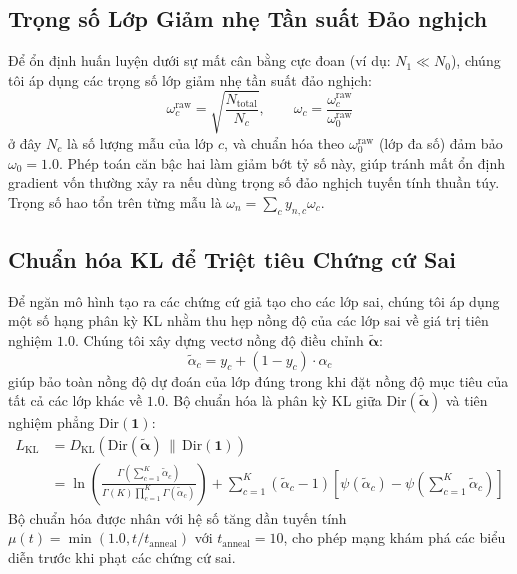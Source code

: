 \documentclass[11pt]{article}
\newcommand{\Dir}{\text{Dir}}
\newcommand{\KL}{D_{\text{KL}}}
\begin{document}
\subsection{Trọng số Lớp Giảm nhẹ Tần suất Đảo nghịch}\label{subsec:class_weight}

Để ổn định huấn luyện dưới sự mất cân bằng cực đoan (ví dụ: $N_1 \ll N_0$), chúng tôi áp dụng các trọng số lớp giảm nhẹ tần suất đảo nghịch:
\begin{equation}\label{eq:class_weights}
    \omega_c^{\text{raw}} = \sqrt{\frac{N_{\text{total}}}{N_c}}, \qquad \omega_c = \frac{\omega_c^{\text{raw}}}{\omega_0^{\text{raw}}}
\end{equation}
ở đây $N_c$ là số lượng mẫu của lớp $c$, và chuẩn hóa theo $\omega_0^{\text{raw}}$ (lớp đa số) đảm bảo $\omega_0 = 1.0$. Phép toán căn bậc hai làm giảm bớt tỷ số này, giúp tránh mất ổn định gradient vốn thường xảy ra nếu dùng trọng số đảo nghịch tuyến tính thuần túy. Trọng số hao tổn trên từng mẫu là $\omega_n = \sum_c y_{n,c} \omega_c$.

\subsection{Chuẩn hóa KL để Triệt tiêu Chứng cứ Sai}\label{subsec:kl_reg}

Để ngăn mô hình tạo ra các chứng cứ giả tạo cho các lớp sai, chúng tôi áp dụng một số hạng phân kỳ KL nhằm thu hẹp nồng độ của các lớp sai về giá trị tiên nghiệm $1.0$. Chúng tôi xây dựng vectơ nồng độ điều chỉnh $\tilde{\bm{\alpha}}$:
\begin{equation}\label{eq:alpha_tilde}
    \tilde{\alpha}_c = y_c + (1 - y_c) \cdot \alpha_c
\end{equation}
giúp bảo toàn nồng độ dự đoán của lớp đúng trong khi đặt nồng độ mục tiêu của tất cả các lớp khác về $1.0$. Bộ chuẩn hóa là phân kỳ KL giữa $\Dir(\tilde{\bm{\alpha}})$ và tiên nghiệm phẳng $\Dir(\bm{1})$:
\begin{align}
    L_{\text{KL}} &= \KL\!\left(\Dir(\tilde{\bm{\alpha}}) \,\|\, \Dir(\bm{1})\right) \nonumber \\
    &= \ln \left( \frac{\Gamma\left(\sum_{c=1}^K \tilde{\alpha}_c\right)}{\Gamma(K) \prod_{c=1}^K \Gamma(\tilde{\alpha}_c)} \right) + \sum_{c=1}^K (\tilde{\alpha}_c - 1)\left[\psi(\tilde{\alpha}_c) - \psi\!\left(\sum_{c=1}^K \tilde{\alpha}_c\right)\right] \label{eq:kl_uniform}
\end{align}
Bộ chuẩn hóa được nhân với hệ số tăng dần tuyến tính $\mu(t) = \min(1.0, t / t_{\text{anneal}})$ với $t_{\text{anneal}} = 10$, cho phép mạng khám phá các biểu diễn trước khi phạt các chứng cứ sai.
\end{document}

